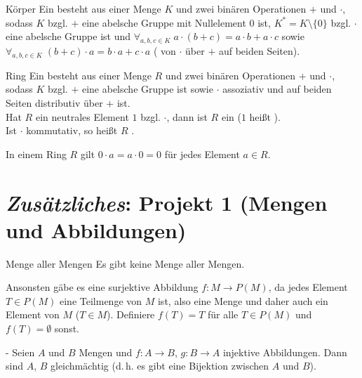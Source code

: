 \begin{Def}{Körper}
    Ein  besteht aus einer Menge $K$ und zwei binären
    Operationen $\boldsymbol{+}$ und $\boldsymbol{\cdot}$, sodass
    $K$ bzgl. $\boldsymbol{+}$ eine abelsche Gruppe mit Nullelement $0$ ist,
    $K^\ast = K \setminus \{0\}$ bzgl. $\boldsymbol{\cdot}$ eine abelsche
    Gruppe ist
    und $\forall_{a, b, c \in K}\; a \cdot (b + c) = a \cdot b + a \cdot c$
    sowie $\forall_{a, b, c \in K}\; (b + c) \cdot a = b \cdot a + c \cdot a$
    ( von $\boldsymbol{\cdot}$ über $\boldsymbol{+}$
    auf beiden Seiten).
\end{Def}

\begin{Def}{Ring}
    Ein  besteht aus einer Menge $R$ und zwei binären Operationen
    $\boldsymbol{+}$ und $\boldsymbol{\cdot}$, sodass
    $K$ bzgl. $\boldsymbol{+}$ eine abelsche Gruppe ist
    sowie $\boldsymbol{\cdot}$ assoziativ und auf beiden Seiten distributiv
    über $\boldsymbol{+}$ ist. \\
    Hat $R$ ein neutrales Element $1$ bzgl. $\boldsymbol{\cdot}$, dann
    ist $R$ ein  ($1$ heißt ). \\
    Ist $\boldsymbol{\cdot}$ kommutativ, so heißt $R$
    .
\end{Def}

\begin{Bem}
    In einem Ring $R$ gilt $0 \cdot a = a \cdot 0 = 0$ für jedes Element
    $a \in R$.
\end{Bem}

\section{%
    \emph{Zusätzliches}: Projekt 1 (Mengen und Abbildungen)%
}

\begin{Satz}{Menge aller Mengen}
    Es gibt keine Menge aller Mengen.
\end{Satz}

\begin{Bem}
    Ansonsten gäbe es eine surjektive Abbildung $f: M \rightarrow P(M)$,
    da jedes Element $T \in P(M)$ eine Teilmenge von $M$ ist, also eine Menge
    und daher auch ein Element von $M$ ($T \in M$).
    Definiere $f(T) = T$ für alle $T \in P(M)$ und $f(T) = \emptyset$ sonst.
\end{Bem}

\begin{Satz}{-}
    Seien $A$ und $B$ Mengen und $f: A \rightarrow B$, $g: B \rightarrow A$
    injektive Abbildungen.
    Dann sind $A$, $B$ gleichmächtig (d.\,h. es gibt eine Bijektion zwischen
    $A$ und $B$).
\end{Satz}

\pagebreak
